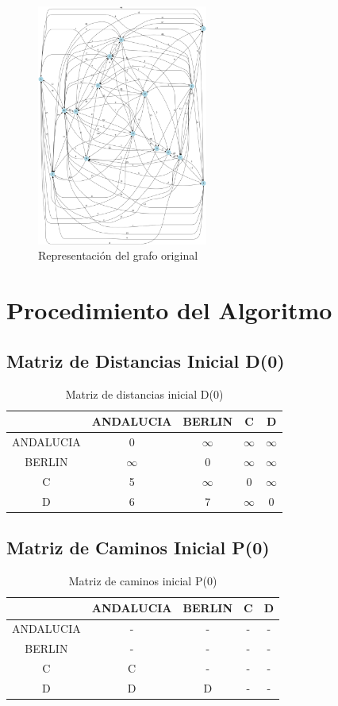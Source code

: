 \documentclass[12pt]{article}
\begin{document}
\begin{figure}[h!]
\centering
\includegraphics[width=0.5\textwidth,keepaspectratio]{grafo.png}
\caption{Representación del grafo original}
\end{figure}

\clearpage
\section{Procedimiento del Algoritmo}
\subsection{Matriz de Distancias Inicial D(0)}
\begin{table}[h!]
\centering
\begin{tabular}{|c|c|c|c|c|}
\hline
 & ANDALUCIA & BERLIN & C & D \\\hline
ANDALUCIA & 0 & $\infty$ & $\infty$ & $\infty$ \\\hline
BERLIN & $\infty$ & 0 & $\infty$ & $\infty$ \\\hline
C & 5 & $\infty$ & 0 & $\infty$ \\\hline
D & 6 & 7 & $\infty$ & 0 \\\hline
\end{tabular}
\caption{Matriz de distancias inicial D(0)}
\end{table}

\clearpage
\subsection{Matriz de Caminos Inicial P(0)}
\begin{table}[h!]
\centering
\begin{tabular}{|c|c|c|c|c|}
\hline
 & ANDALUCIA & BERLIN & C & D \\\hline
ANDALUCIA & - & - & - & - \\\hline
BERLIN & - & - & - & - \\\hline
C & C & - & - & - \\\hline
D & D & D & - & - \\\hline
\end{tabular}
\caption{Matriz de caminos inicial P(0)}
\end{table}
\end{document}
